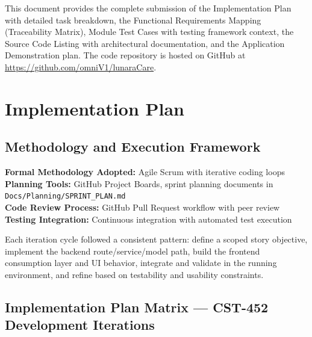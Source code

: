 \documentclass[12pt,letterpaper]{article}
\begin{document}
This document provides the complete submission of the Implementation Plan with detailed task breakdown, the Functional Requirements Mapping (Traceability Matrix), Module Test Cases with testing framework context, the Source Code Listing with architectural documentation, and the Application Demonstration plan. The code repository is hosted on GitHub at \url{https://github.com/omniV1/lunaraCare}.

\newpage

\section{Implementation Plan}

\subsection{Methodology and Execution Framework}

\textbf{Formal Methodology Adopted:} Agile Scrum with iterative coding loops\\
\textbf{Planning Tools:} GitHub Project Boards, sprint planning documents in \texttt{Docs/Planning/SPRINT\_PLAN.md}\\
\textbf{Code Review Process:} GitHub Pull Request workflow with peer review\\
\textbf{Testing Integration:} Continuous integration with automated test execution

Each iteration cycle followed a consistent pattern: define a scoped story objective, implement the backend route/service/model path, build the frontend consumption layer and UI behavior, integrate and validate in the running environment, and refine based on testability and usability constraints.

\subsection{Implementation Plan Matrix --- CST-452 Development Iterations}
\end{document}
